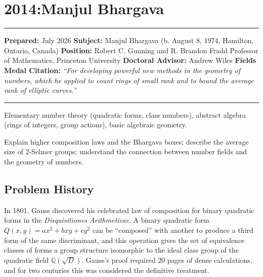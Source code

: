 \chapter{2014:Manjul Bhargava}\label{ch2014manjulbhargava:manjul-bhargava-fields-medal-2014-a-comprehensive-report-on-his-work-and-impact}

\begin{center}\rule{0.5\linewidth}{0.5pt}\end{center}

\textbf{Prepared:} July 2026 \textbf{Subject:} Manjul Bhargava (b. August 8, 1974, Hamilton, Ontario, Canada) \textbf{Position:} Robert C. Gunning and R. Brandon Fradd Professor of Mathematics, Princeton University \textbf{Doctoral Advisor:} Andrew Wiles \textbf{Fields Medal Citation:} \emph{``For developing powerful new methods in the geometry of numbers, which he applied to count rings of small rank and to bound the average rank of elliptic curves.''}

\begin{center}\rule{0.5\linewidth}{0.5pt}\end{center}

\begin{prereqs} Elementary number theory (quadratic forms, class numbers), abstract algebra (rings of integers, group actions), basic algebraic geometry. \end{prereqs}

\begin{objectives} Explain higher composition laws and the Bhargava boxes; describe the average size of 2-Selmer groups; understand the connection between number fields and the geometry of numbers. \end{objectives}

\section{Problem History}

In 1801, Gauss discovered his celebrated law of composition for binary quadratic forms in the \emph{Disquisitiones Arithmeticae}. A binary quadratic form $Q(x,y) = ax^2 + bxy + cy^2$ can be ``composed'' with another to produce a third form of the same discriminant, and this operation gives the set of equivalence classes of forms a group structure isomorphic to the ideal class group of the quadratic field $\mathbb{Q}(\sqrt{D})$. Gauss's proof required 20 pages of dense calculations, and for two centuries this was considered the definitive treatment.


